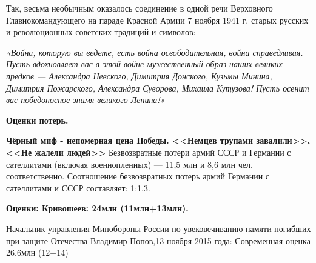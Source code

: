 \documentclass[a4paper,14pt]{extarticle}
\begin{document}
Так, весьма необычным оказалось соединение в одной речи Верховного Главнокомандующего на параде Красной Армии 7 ноября 1941 г. старых русских и революционных советских традиций и символов: 

\textit{«Война, которую вы ведете, есть война освободительная, война справедливая. Пусть вдохновляет вас в этой войне мужественный образ наших великих предков — Александра Невского, Димитрия Донского, Кузьмы Минина, Димитрия Пожарского, Александра Суворова, Михаила Кутузова! Пусть осенит вас победоносное знамя великого Ленина!»}

\textbf{Оценки потерь.}

\textbf{Чёрный миф - непомерная цена Победы. <<Немцев трупами завалили>>, <<Не жалели людей>>}
Безвозвратные потери армий СССР и Германии с сателлитами (включая военнопленных) — 11,5 млн и 8,6 млн чел. соответственно. Соотношение безвозвратных потерь армий Германии с сателлитами и СССР составляет: 1:1,3. 

\textbf{Оценки: Кривошеев: 24млн (11млн+13млн).}

Начальник управления Минобороны России по увековечиванию памяти погибших при защите Отечества Владимир Попов,13 ноября 2015 года: Современная оценка 26.6млн (12+14)
\end{document}
